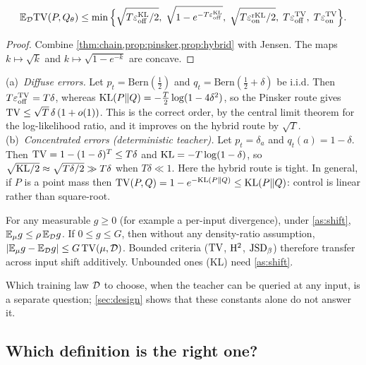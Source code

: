 \begin{corollary}\label{cor:seq-tv}
\Pv
\[
\mathbb{E}_{\mathcal{D}}\mathrm{TV}(P,Q_\theta)\le\min\Big\{\sqrt{T\varepsilon_{\mathrm{off}}^{\mathrm{KL}}/2},\;\sqrt{1-e^{-T\varepsilon_{\mathrm{off}}^{\mathrm{KL}}}},\;\sqrt{T\varepsilon_{\mathrm{on}}^{\mathrm{rKL}}/2},\;
T\varepsilon_{\mathrm{off}}^{\mathrm{TV}},\;T\varepsilon_{\mathrm{on}}^{\mathrm{TV}}\Big\}.
\]
\end{corollary}
\begin{proof}
Combine \cref{thm:chain,prop:pinsker,prop:hybrid} with Jensen. The maps $k\mapsto\sqrt k$ and
$k\mapsto\sqrt{1-e^{-k}}$ are concave.
\end{proof}

\begin{example}\label{ex:regimes}
\Pv
(a)~\emph{Diffuse errors.} Let $p_t=\mathrm{Bern}(\frac12)$ and $q_t=\mathrm{Bern}(\frac12+\delta)$ be i.i.d.
Then $T\varepsilon_{\mathrm{off}}^{\mathrm{TV}}=T\delta$, whereas $\mathrm{KL}(P\|Q)=-\frac T2\log(1-4\delta^2)$, so the Pinsker route gives
$\mathrm{TV}\le\sqrt T\,\delta\,(1+o(1))$. This is the correct order, by the central limit theorem for the
log-likelihood ratio, and it improves on the hybrid route by $\sqrt T$.
(b)~\emph{Concentrated errors (deterministic teacher).} Let $p_t=\delta_{a}$ and $q_t(a)=1-\delta$. Then
$\mathrm{TV}=1-(1-\delta)^T\le T\delta$ and $\mathrm{KL}=-T\log(1-\delta)$, so $\sqrt{\mathrm{KL}/2}\approx\sqrt{T\delta/2}\gg T\delta$
when $T\delta\ll1$. Here the hybrid route is tight. In general, if $P$ is a point mass then
$\mathrm{TV}(P,Q)=1-e^{-\mathrm{KL}(P\|Q)}\le\mathrm{KL}(P\|Q)$: control is linear rather than square-root.
\end{example}

\begin{proposition}\label{prop:covshift}
\Pv For any measurable $g\ge0$ (for example a per-input divergence), under \cref{as:shift},
$\mathbb{E}_\mu g\le\rho\,\mathbb{E}_{\mathcal{D}} g$. If $0\le g\le G$, then without any density-ratio assumption,
$|\mathbb{E}_\mu g-\mathbb{E}_{\mathcal{D}} g|\le G\,\mathrm{TV}(\mu,\mathcal{D})$.
Bounded criteria ($\mathrm{TV}$, $\mathrm{H}^2$, $\mathrm{JSD}_\beta$) therefore transfer across input shift additively.
Unbounded ones (KL) need \cref{as:shift}.
\end{proposition}
\noindent
Which training law $\mathcal{D}$ to choose, when the teacher can be queried at any input, is a separate
question; \cref{sec:design} shows that these constants alone do not answer it.

\subsection{Which definition is the right one?}\label{sec:right}

